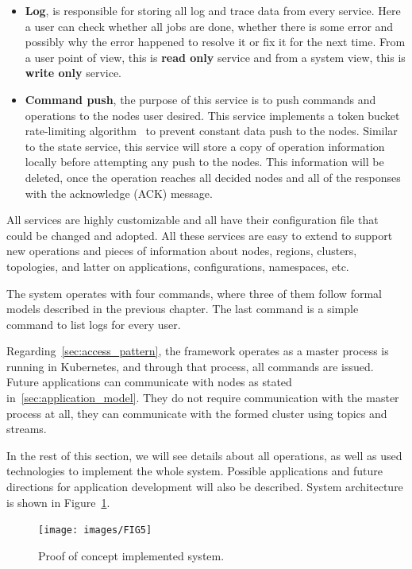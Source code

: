 \begin{itemize}
	\item \textbf{Log}, is responsible for storing all log and trace data from every service. Here a user can check whether all jobs are done, whether there is some error and possibly why the error happened to resolve it or fix it for the next time. From a user point of view, this is \textbf{read only} service and from a system view, this is \textbf{write only} service.
	\item \textbf{Command push}, the purpose of this service is to push commands and operations to the nodes user desired. This service implements a token bucket rate-limiting algorithm~\cite{MathewsKG17} to prevent constant data push to the nodes. Similar to the state service, this service will store a copy of operation information locally before attempting any push to the nodes. This information will be deleted, once the operation reaches all decided nodes and all of the responses with the acknowledge (ACK) message.
\end{itemize}

\noindent
All services are highly customizable and all have their configuration file that could be changed and adopted. All these services are easy to extend to support new operations and pieces of information about nodes, regions, clusters, topologies, and latter on applications, configurations, namespaces, etc. 

The system operates with four commands, where three of them follow formal models described in the previous chapter. The last command is a simple command to list logs for every user.

Regarding~\ref{sec:access_pattern}, the framework operates as a master process is running in Kubernetes, and through that process, all commands are issued. Future applications can communicate with nodes as stated in~\ref{sec:application_model}. They do not require communication with the master process at all, they can communicate with the formed cluster using topics and streams.

In the rest of this section, we will see details about all operations, as well as used technologies to implement the whole system. Possible applications and future directions for application development will also be described. System architecture is shown in Figure~\ref{fig:fig11}.

\begin{figure}[H]
	\begin{center}
		\texttt{[image: images/FIG5]}
	\end{center}
	\vspace{-0.9cm}
	\caption{Proof of concept implemented system.}
	\label{fig:fig11}
\end{figure}
%
%
